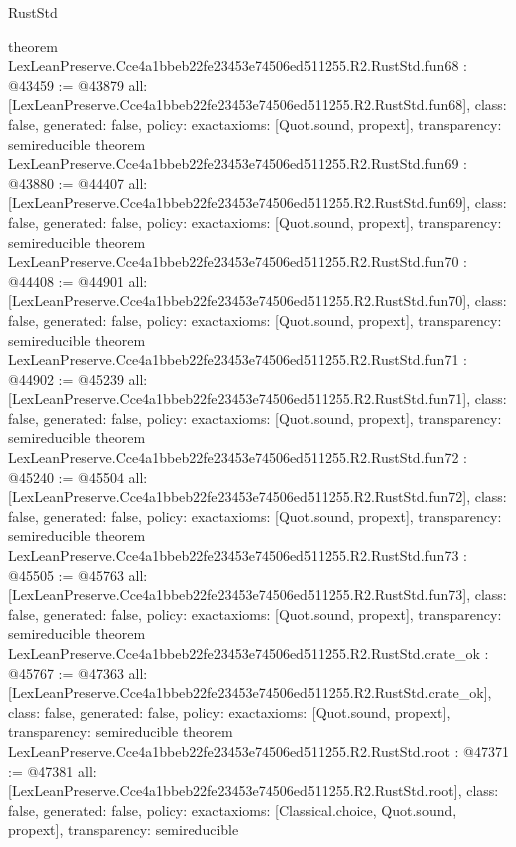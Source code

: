 \begin{lexlean}{RustStd}
\begin{coremodule}
{}
theorem LexLeanPreserve.Cce4a1bbeb22fe23453e74506ed511255.R2.RustStd.fun68 : @43459 := @43879 {
  all: [LexLeanPreserve.Cce4a1bbeb22fe23453e74506ed511255.R2.RustStd.fun68],
  class: false,
  generated: false,
  policy: exact{axioms: [Quot.sound, propext]},
  transparency: semireducible
}
theorem LexLeanPreserve.Cce4a1bbeb22fe23453e74506ed511255.R2.RustStd.fun69 : @43880 := @44407 {
  all: [LexLeanPreserve.Cce4a1bbeb22fe23453e74506ed511255.R2.RustStd.fun69],
  class: false,
  generated: false,
  policy: exact{axioms: [Quot.sound, propext]},
  transparency: semireducible
}
theorem LexLeanPreserve.Cce4a1bbeb22fe23453e74506ed511255.R2.RustStd.fun70 : @44408 := @44901 {
  all: [LexLeanPreserve.Cce4a1bbeb22fe23453e74506ed511255.R2.RustStd.fun70],
  class: false,
  generated: false,
  policy: exact{axioms: [Quot.sound, propext]},
  transparency: semireducible
}
theorem LexLeanPreserve.Cce4a1bbeb22fe23453e74506ed511255.R2.RustStd.fun71 : @44902 := @45239 {
  all: [LexLeanPreserve.Cce4a1bbeb22fe23453e74506ed511255.R2.RustStd.fun71],
  class: false,
  generated: false,
  policy: exact{axioms: [Quot.sound, propext]},
  transparency: semireducible
}
theorem LexLeanPreserve.Cce4a1bbeb22fe23453e74506ed511255.R2.RustStd.fun72 : @45240 := @45504 {
  all: [LexLeanPreserve.Cce4a1bbeb22fe23453e74506ed511255.R2.RustStd.fun72],
  class: false,
  generated: false,
  policy: exact{axioms: [Quot.sound, propext]},
  transparency: semireducible
}
theorem LexLeanPreserve.Cce4a1bbeb22fe23453e74506ed511255.R2.RustStd.fun73 : @45505 := @45763 {
  all: [LexLeanPreserve.Cce4a1bbeb22fe23453e74506ed511255.R2.RustStd.fun73],
  class: false,
  generated: false,
  policy: exact{axioms: [Quot.sound, propext]},
  transparency: semireducible
}
theorem LexLeanPreserve.Cce4a1bbeb22fe23453e74506ed511255.R2.RustStd.crate_ok : @45767 := @47363 {
  all: [LexLeanPreserve.Cce4a1bbeb22fe23453e74506ed511255.R2.RustStd.crate_ok],
  class: false,
  generated: false,
  policy: exact{axioms: [Quot.sound, propext]},
  transparency: semireducible
}
theorem LexLeanPreserve.Cce4a1bbeb22fe23453e74506ed511255.R2.RustStd.root : @47371 := @47381 {
  all: [LexLeanPreserve.Cce4a1bbeb22fe23453e74506ed511255.R2.RustStd.root],
  class: false,
  generated: false,
  policy: exact{axioms: [Classical.choice, Quot.sound, propext]},
  transparency: semireducible
}


\end{coremodule}
\end{lexlean}
